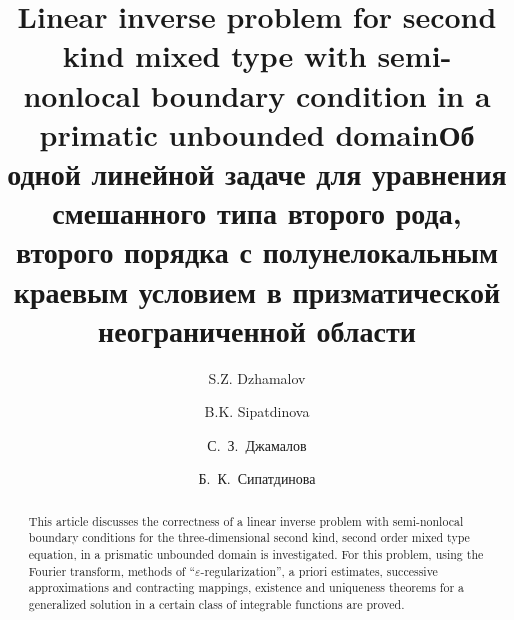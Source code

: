 \begin{englishtitle} %
\title{Linear inverse problem for second kind mixed type with semi-nonlocal boundary condition in a primatic unbounded domain}
\author{S.Z. Dzhamalov \and  B.K. Sipatdinova
}

\maketitle

\begin{abstract}
This article discusses the correctness of a linear inverse problem with semi-nonlocal boundary conditions for the three-dimensional second kind, second order mixed type equation, in a prismatic unbounded domain is investigated. For this problem, using the Fourier transform, methods of ``$\varepsilon$-regularization'', a priori estimates, successive approximations and contracting mappings, existence and uniqueness theorems for a generalized solution in a certain class of integrable functions are proved.

\end{abstract}
\end{englishtitle}







\title{Об одной линейной задаче для уравнения смешанного типа второго рода, второго порядка с полунелокальным краевым условием в призматической неограниченной области}
\author{С.~З.~Джамалов \and  Б.~К.~Сипатдинова
  \and
}


